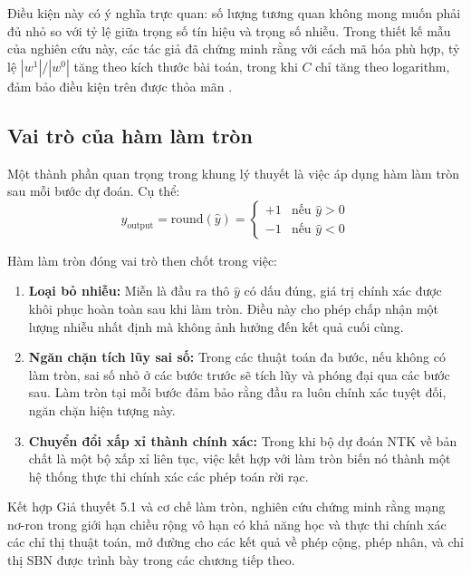 Điều kiện này có ý nghĩa trực quan: số lượng tương quan không mong muốn phải đủ nhỏ so với tỷ lệ giữa trọng số tín hiệu và trọng số nhiễu. Trong thiết kế mẫu của nghiên cứu này, các tác giả đã chứng minh rằng với cách mã hóa phù hợp, tỷ lệ $|w^1|/|w^0|$ tăng theo kích thước bài toán, trong khi $C$ chỉ tăng theo logarithm, đảm bảo điều kiện trên được thỏa mãn \cite{de_luca_2025}.

\subsection{Vai trò của hàm làm tròn}

Một thành phần quan trọng trong khung lý thuyết là việc áp dụng hàm làm tròn sau mỗi bước dự đoán. Cụ thể:
\begin{equation}
    y_{\text{output}} = \text{round}(\hat{y}) = 
    \begin{cases}
        +1 & \text{nếu } \hat{y} > 0 \\
        -1 & \text{nếu } \hat{y} < 0
    \end{cases}
\end{equation}

Hàm làm tròn đóng vai trò then chốt trong việc:
\begin{enumerate}
    \item \textbf{Loại bỏ nhiễu:} Miễn là đầu ra thô $\hat{y}$ có dấu đúng, giá trị chính xác được khôi phục hoàn toàn sau khi làm tròn. Điều này cho phép chấp nhận một lượng nhiễu nhất định mà không ảnh hưởng đến kết quả cuối cùng.
    
    \item \textbf{Ngăn chặn tích lũy sai số:} Trong các thuật toán đa bước, nếu không có làm tròn, sai số nhỏ ở các bước trước sẽ tích lũy và phóng đại qua các bước sau. Làm tròn tại mỗi bước đảm bảo rằng đầu ra luôn chính xác tuyệt đối, ngăn chặn hiện tượng này.
    
    \item \textbf{Chuyển đổi xấp xỉ thành chính xác:} Trong khi bộ dự đoán NTK về bản chất là một bộ xấp xỉ liên tục, việc kết hợp với làm tròn biến nó thành một hệ thống thực thi chính xác các phép toán rời rạc.
\end{enumerate}

Kết hợp Giả thuyết 5.1 và cơ chế làm tròn, nghiên cứu chứng minh rằng mạng nơ-ron trong giới hạn chiều rộng vô hạn có khả năng học và thực thi chính xác các chỉ thị thuật toán, mở đường cho các kết quả về phép cộng, phép nhân, và chỉ thị SBN được trình bày trong các chương tiếp theo.

